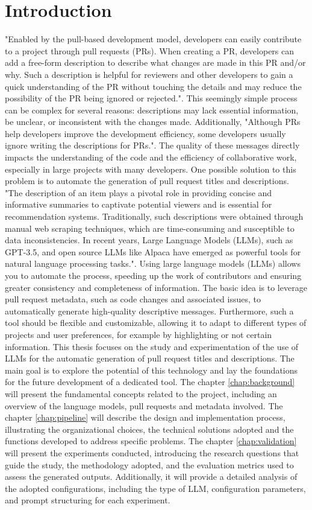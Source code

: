 \chapter{Introduction}
"Enabled by the pull-based development model, developers can easily contribute to a project through pull requests (PRs). When creating a PR, developers can add a free-form description to describe what changes are made in this PR and/or why. Such a description is helpful for reviewers and other developers to gain a quick understanding of the PR without touching the details and may reduce the possibility of the PR being ignored or rejected."\citet{8952330}. This seemingly simple process can be complex for several reasons: descriptions may lack essential information, be unclear, or inconsistent with the changes made. Additionally, "Although PRs help developers improve the development efficiency, some developers usually ignore writing the descriptions for PRs."\citet{fang_prhan_2022}. The quality of these messages directly impacts the understanding of the code and the efficiency of collaborative work, especially in large projects with many developers. One possible solution to this problem is to automate the generation of pull request titles and descriptions. "The description of an item plays a pivotal role in providing concise and informative summaries to captivate potential viewers and is essential for recommendation systems.  Traditionally, such descriptions were obtained through manual web scraping techniques, which are time-consuming and susceptible to data inconsistencies. In recent years, Large Language Models (LLMs), such as GPT-3.5, and open source LLMs like Alpaca have emerged as powerful tools for natural language processing tasks."\citet{10.1145/3604915.3610647}. Using large language models (LLMs) allows you to automate the process, speeding up the work of contributors and ensuring greater consistency and completeness of information. The basic idea is to leverage pull request metadata, such as code changes and associated issues, to automatically generate high-quality descriptive messages. Furthermore, such a tool should be flexible and customizable, allowing it to adapt to different types of projects and user preferences, for example by highlighting or not certain information. This thesis focuses on the study and experimentation of the use of LLMs for the automatic generation of pull request titles and descriptions. The main goal is to explore the potential of this technology and lay the foundations for the future development of a dedicated tool. The chapter \ref{chap:background} will present the fundamental concepts related to the project, including an overview of the language models, pull requests and metadata involved. The chapter \ref{chap:pipeline} will describe the design and implementation process, illustrating the organizational choices, the technical solutions adopted and the functions developed to address specific problems. The chapter \ref{chap:validation} will present the experiments conducted, introducing the research questions that guide the study, the methodology adopted, and the evaluation metrics used to assess the generated outputs. Additionally, it will provide a detailed analysis of the adopted configurations, including the type of LLM, configuration parameters, and prompt structuring for each experiment.
